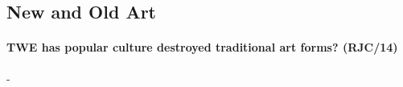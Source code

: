 \documentclass[../../main]{subfiles}
\begin{document}
\subsection{New and Old Art}

\paragraph{TWE has popular culture destroyed traditional art forms? (RJC/14)}-
\end{document}
